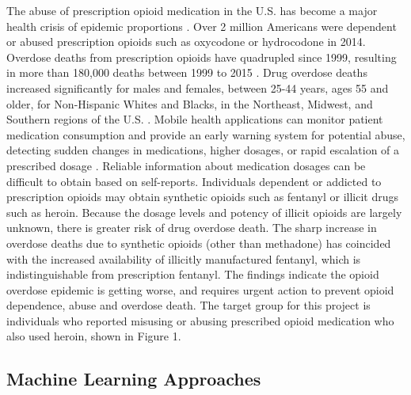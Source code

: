 \documentclass[sigconf]{acmart}
\begin{document}
The abuse of prescription opioid medication in the U.S. has become a major 
health crisis of epidemic proportions \cite{volkow14}. Over 2 million Americans 
were dependent or abused prescription opioids such as oxycodone or hydrocodone 
in 2014\cite{cdc17}. Overdose deaths from prescription opioids have quadrupled 
since 1999, resulting in more than 180,000 deaths between 1999 to 2015 
\cite{nida17}. Drug overdose deaths increased significantly for males and 
females, between 25-44 years, ages 55 and older, for Non-Hispanic Whites and 
Blacks, in the Northeast, Midwest, and Southern regions of the U.S.
\cite{cdc16}. Mobile health applications can monitor patient medication 
consumption and provide an early warning system for potential abuse, detecting 
sudden changes in medications, higher dosages, or rapid escalation of a 
prescribed dosage \cite{varshney13}. Reliable information about medication 
dosages can be difficult to obtain based on self-reports. Individuals dependent 
or addicted to prescription opioids may obtain synthetic opioids such as 
fentanyl or illicit drugs such as heroin. Because the dosage levels and potency 
of illicit opioids are largely unknown, there is greater risk of drug overdose 
death. The sharp increase in overdose deaths due to synthetic opioids (other 
than methadone) has coincided with the increased availability of illicitly
manufactured fentanyl, which is indistinguishable from prescription fentanyl. 
The findings indicate the opioid overdose epidemic is getting worse, and 
requires urgent action to prevent opioid dependence, abuse and overdose death. 
The target group for this project is individuals who reported misusing or 
abusing prescribed opioid medication who also used heroin, shown in Figure 1. 

\subsection{Machine Learning Approaches} 
\end{document}
